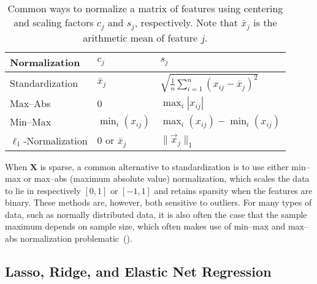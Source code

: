 \begin{table}[hbt]
  \centering
  \caption{
    Common ways to normalize a matrix of features using centering and scaling
    factors \(c_j\) and \(s_j\), respectively. Note that \(\bar{x}_j\) is
    the arithmetic mean of feature \(j\).
  }
  \label{tab:normalization-types}
  \vskip 0.15in
  \small
  \begin{tabular}{lll}
    \toprule
    Normalization            & \(c_{j}\)          & \(s_j\)                                                   \\
    \midrule
    Standardization          & \(\bar{x}_j\)      & \(\sqrt{\frac{1}{n}\sum_{i=1}^n (x_{ij} - \bar{x}_j)^2}\) \\
    \addlinespace
    Max--Abs                 & 0                  & \(\max_i|x_{ij}|\)                                        \\
    \addlinespace
    Min--Max                 & \(\min_i(x_{ij})\) & \(\max_i(x_{ij}) - \min_i(x_{ij})\)                       \\
    \addlinespace
    \(\ell_1\)-Normalization & 0 or \(\bar{x}_j\) & \(\lVert \vec{x}_j\rVert_1\)                              \\
    \bottomrule
  \end{tabular}
\end{table}

When \(\bm{X}\) is sparse, a common alternative to standardization is to use either
min--max or max--abs (maximum absolute value) normalization, which scales the data to lie
in respectively \([0, 1]\) or \([-1, 1]\) and retains sparsity when the features are
binary. These methods are, however, both sensitive to outliers. For many types of data,
such as normally distributed data, it is also often the case that the sample maximum
depends on sample size, which often makes use of min--max and max--abs normalization
problematic~().

\subsection{Lasso, Ridge, and Elastic Net Regression}%
\label{sec:elastic-net-solution}

